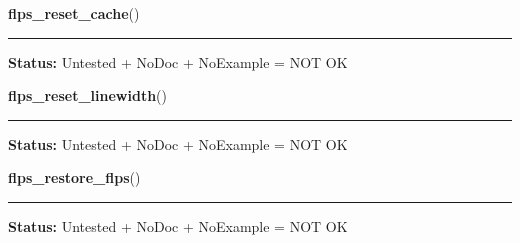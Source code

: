     \label{xformslib:library:flps_reset_cache}

    \vspace{0.5ex}

\hspace{.8\funcindent}\begin{boxedminipage}{\funcwidth}

    \raggedright \textbf{flps\_reset\_cache}()

    \vspace{-1.5ex}

    \rule{\textwidth}{0.5\fboxrule}
\setlength{\parskip}{2ex}
\setlength{\parskip}{1ex}
\textbf{Status:} Untested + NoDoc + NoExample = NOT OK



    \end{boxedminipage}

    \label{xformslib:library:flps_reset_linewidth}

    \vspace{0.5ex}

\hspace{.8\funcindent}\begin{boxedminipage}{\funcwidth}

    \raggedright \textbf{flps\_reset\_linewidth}()

    \vspace{-1.5ex}

    \rule{\textwidth}{0.5\fboxrule}
\setlength{\parskip}{2ex}
\setlength{\parskip}{1ex}
\textbf{Status:} Untested + NoDoc + NoExample = NOT OK



    \end{boxedminipage}

    \label{xformslib:library:flps_restore_flps}

    \vspace{0.5ex}

\hspace{.8\funcindent}\begin{boxedminipage}{\funcwidth}

    \raggedright \textbf{flps\_restore\_flps}()

    \vspace{-1.5ex}

    \rule{\textwidth}{0.5\fboxrule}
\setlength{\parskip}{2ex}
\setlength{\parskip}{1ex}
\textbf{Status:} Untested + NoDoc + NoExample = NOT OK



    \end{boxedminipage}

